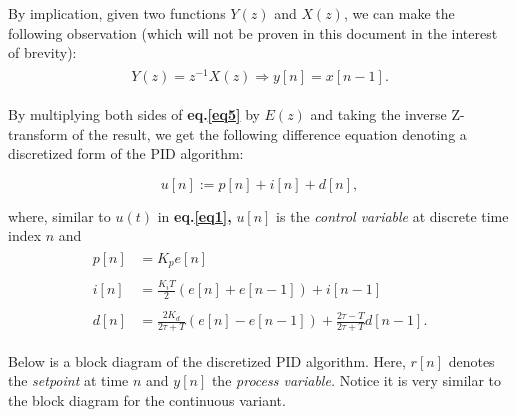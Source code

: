 \documentclass[11pt]{article}
\theoremstyle{definition}
\begin{document}
By implication, given two functions $Y(z)$ and $X(z)$, we can make the following observation (which will not be proven in this document in
the interest of brevity):
\begin{align*}
\begin{split}
    Y(z) = z^{-1}X(z) \Rightarrow y[n] = x[n-1].
\end{split}
\end{align*}

By multiplying both sides of \textbf{eq.\ref{eq5}} by $E(z)$ and taking the inverse Z-transform of the result, we get the following difference equation denoting
a discretized form of the PID algorithm:

\begin{equation} \label{eq6}
\boxed{
    u[n] := p[n] + i[n] + d[n],
}
\end{equation}

where, similar to $u(t)$ in \textbf{eq.\ref{eq1},} $u[n]$ is the \textit{control variable} at discrete time index $n$ and
\begin{align*}
\begin{split}
    p[n] &= K_{p}e[n] \\\\
    i[n] &= \frac{K_{i}T}{2}\left(e[n] + e[n-1]\right) + i[n-1] \\\\
    d[n] &= \frac{2K_{d}}{2\tau + T}\left(e[n] - e[n-1]\right) + \frac{2\tau - T}{2\tau + T}d[n-1].
\end{split}
\end{align*}

\newpage
Below is a block diagram of the discretized PID algorithm. Here, $r[n]$ denotes the \textit{setpoint} at time $n$ and $y[n]$ the \textit{process variable.}
Notice it is very similar to the block diagram for the continuous variant.
\end{document}
